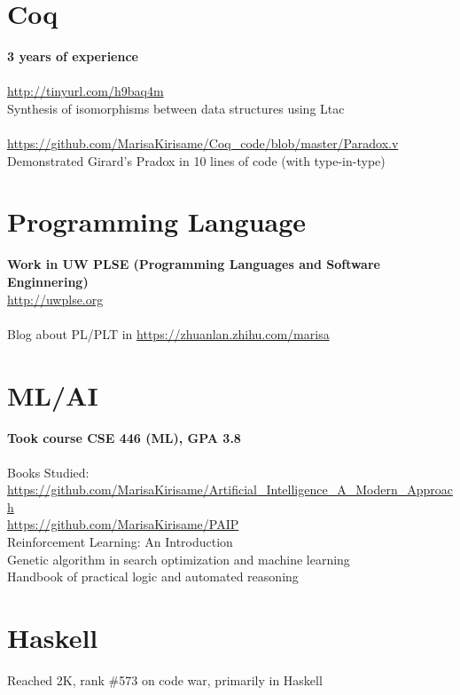 \documentclass[margin,line]{res}
\begin{document}
\begin{resume}
\section{\sc Coq} 
\textbf{3 years of experience} \\
\\
\url{http://tinyurl.com/h9baq4m} \\
Synthesis of isomorphisms between data structures using Ltac \\
\\
\url{https://github.com/MarisaKirisame/Coq_code/blob/master/Paradox.v} \\
Demonstrated Girard's Pradox in 10 lines of code (with type-in-type)

\section{\sc Programming Language}
\textbf{Work in UW PLSE (Programming Languages and Software Enginnering)} \\
\url{http://uwplse.org}
\\
\\
Blog about PL/PLT in \url{https://zhuanlan.zhihu.com/marisa}

\section{\sc ML/AI}
\textbf{Took course CSE 446 (ML), GPA 3.8} \\
\\
Books Studied: \\
\url{https://github.com/MarisaKirisame/Artificial_Intelligence_A_Modern_Approach} \\
\url{https://github.com/MarisaKirisame/PAIP} \\
Reinforcement Learning: An Introduction \\
Genetic algorithm in search optimization and machine learning \\
Handbook of practical logic and automated reasoning

\section{\sc Haskell} Reached 2K, rank \#573 on code war, primarily in Haskell

\vspace*{-.2in}

\end{resume}
\end{document}
